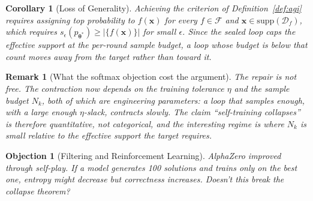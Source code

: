 \documentclass[11pt,a4paper]{article}
\newtheorem{corollary}[theorem]{Corollary}
\newtheorem{remark}[theorem]{Remark}
\newtheorem{objection}{Objection}
\begin{document}
\begin{corollary}[Loss of Generality]
\label{cor:loss_generality}
Achieving the criterion of Definition~\ref{def:agi} requires assigning top probability to $f(\bm{x})$ for every $f \in \mathcal{F}$ and $\bm{x} \in \mathrm{supp}(\mathcal{D}_f)$, which requires $s_\epsilon(p_{\bm{\theta}^*}) \geq |\{f(\bm{x})\}|$ for small $\epsilon$. Since the sealed loop caps the effective support at the per-round sample budget, a loop whose budget is below that count moves away from the target rather than toward it.
\end{corollary}

\begin{remark}[What the softmax objection cost the argument]
\label{sec:collapse_note}
The repair is not free. The contraction now depends on the training tolerance $\eta$ and the sample budget $N_k$, both of which are engineering parameters: a loop that samples enough, with a large enough $\eta$-slack, contracts slowly. The claim ``self-training collapses'' is therefore quantitative, not categorical, and the interesting regime is where $N_k$ is small relative to the effective support the target requires.
\end{remark}

\begin{objection}[Filtering and Reinforcement Learning]
AlphaZero improved through self-play. If a model generates 100 solutions and trains only on the best one, entropy might decrease but correctness increases. Doesn't this break the collapse theorem?
\end{objection}
\end{document}
